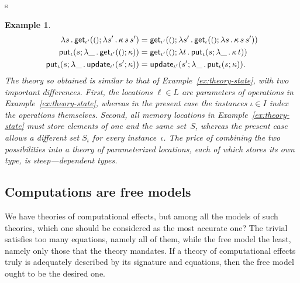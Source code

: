 s\documentclass{amsart}
\newcommand{\lam}[1]{\lambda #1 \,.\,}
\newcommand{\unit}{{\text{\small$()$}}} %
\newcommand{\kode}[1]{\mathsf{#1}}
\newcommand{\opcall}[3]{\kode{#1}(#2; #3)}
\newtheorem{example}[definition]{Example}
\begin{document}
\begin{example}
\begin{align*}
{       \lam{s} \opcall{get_{\iota'}}{\unit}{\lam{s'} \kappa \, s \, s'}
    } &=
    \opcall{get_{\iota'}}{\unit}{
       \lam{s'} \opcall{get_\iota}{\unit}{\lam{s} \kappa \, s \, s'}
    }
    \\
    \opcall{put_\iota}{s}{
       \lam{\_} \opcall{get_{\iota'}}{\unit}{\kappa}
    } &=
    \opcall{get_{\iota'}}{\unit}{
       \lam{t} \opcall{put_\iota}{s}{
          \lam{\_} \kappa \, t
       }
    } \\
    \opcall{put_\iota}{s}{
       \lam{\_} \opcall{update_{\iota'}}{s'}{\kappa}
    } &=
    \opcall{update_{\iota'}}{s'}{
       \lam{\_} \opcall{put_\iota}{s}{\kappa}
    }.
  \end{align*}
  The theory so obtained is similar to that of Example~\ref{ex:theory-state},
  with two important differences. First, the locations $\ell \in L$ are
  parameters of operations in Example~\ref{ex:theory-state}, whereas in the
  present case the instances $\iota \in I$ index the operations themselves.
  Second, all memory locations in Example~\ref{ex:theory-state} must store
  elements of one and the same set~$S$, whereas the present case allows a
  different set $S_\iota$ for every instance~$\iota$. The price of combining the
  two possibilities into a theory of parameterized locations, each of which stores
  its own type, is steep---dependent types.
\end{example}

\subsection{Computations are free models}
\label{sec:comp-are-free}

We have theories of computational effects, but among all the models of such
theories, which one should be considered as the most accurate one? The trivial
satisfies too many equations, namely all of them, while the free model the
least, namely only those that the theory mandates. If a theory of computational
effects truly is adequately described by its signature and equations, then the
free model ought to be the desired one.
\end{document}

